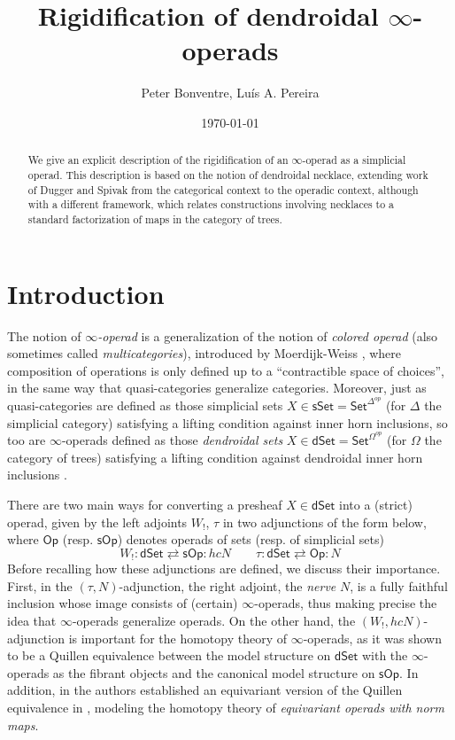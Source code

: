 \documentclass[a4paper,10pt
,draft
]{article}%
\title{Rigidification of dendroidal $\infty$-operads}
\author{Peter Bonventre, Lu\'is A. Pereira}%
\date{\today}
\numberwithin{equation}{section}
\numberwithin{figure}{section}
\theoremstyle{definition} %
\newcommand{\Op}{\mathsf{Op}}%
\newcommand{\sOp}{\ensuremath{\mathsf{sOp}}}%
\newcommand{\dSet}{\mathsf{dSet}}
\newcommand{\1}{\ensuremath{\mathbbm 1}}%
\begin{document}
\maketitle

\begin{abstract}
	We give an explicit description
	of the rigidification of an $\infty$-operad
	as a simplicial operad.
	This description is based on the notion of 
	dendroidal necklace, 
	extending work of 
	Dugger and Spivak
	from the categorical context to 
	the operadic context,
	although with a different framework,
	which relates constructions involving necklaces 
	to a standard factorization
	of maps in the category of trees.
\end{abstract}

\tableofcontents







\section{Introduction}

The notion of \emph{$\infty$-operad} is a generalization of the notion of \emph{colored operad}
(also sometimes called \emph{multicategories}),
introduced by Moerdijk-Weiss \cite{MW07},
where composition of operations is only defined up to a
``contractible space of choices'',
in the same way that quasi-categories generalize categories.
Moreover, just as quasi-categories are defined as those simplicial sets 
$X \in \mathsf{sSet} = \mathsf{Set}^{\Delta^{op}}$
(for $\Delta$ the simplicial category)
satisfying a lifting condition against inner horn inclusions,
so too are $\infty$-operads defined as those \emph{dendroidal sets}
$X \in \mathsf{dSet} = \mathsf{Set}^{\Omega^{op}}$
(for $\Omega$ the category of trees)
satisfying a lifting condition against 
dendroidal inner horn inclusions \cite[\S 2.1]{CM11}.


There are two main ways for converting 
a presheaf $X \in \mathsf{dSet}$
into a (strict) operad,
given by the left adjoints
$W_!$, $\tau$
in two adjunctions of the form below,
where $\Op$ (resp. $\sOp$) denotes operads of sets (resp. of simplicial sets)
\begin{equation}\label{SOPDSET_EQ}
	W_! \colon \dSet \rightleftarrows \sOp \colon h c N
	\qquad
	\tau \colon \dSet \rightleftarrows \Op \colon N
\end{equation}
Before recalling how these adjunctions are defined,
we discuss their importance. 
First, in the $(\tau,N)$-adjunction,
the right adjoint, the \emph{nerve} $N$,
is a fully faithful inclusion whose image consists of 
(certain) $\infty$-operads,
thus making precise the idea that 
$\infty$-operads generalize operads.
On the other hand, the $(W_!,hcN)$-adjunction
is important for the homotopy theory of $\infty$-operads,
as it was shown to be a Quillen equivalence \cite{CM13b}
between the model structure on $\dSet$ with the 
$\infty$-operads as the fibrant objects and
the canonical model structure on $\sOp$.
In addition, in \cite{BP_TAS} the authors established an equivariant
version of the Quillen equivalence in \cite{CM13b},
modeling the homotopy theory of 
\emph{equivariant operads with norm maps}.
\end{document}
